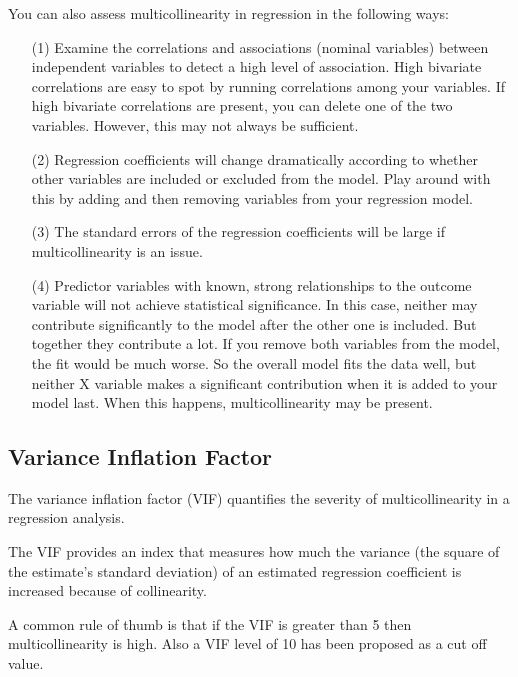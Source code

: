 \documentclass[12pt]{article}
\begin{document}
\bigskip

You can also assess multicollinearity in regression in the following ways:

\begin{itemize}
	\item [(1)] Examine the correlations and associations (nominal variables) between independent variables to detect a high level of association. High bivariate correlations are easy to spot by running correlations among your variables. If high bivariate correlations are present, you can delete one of the two variables. However, this may not always be sufficient.
	
	\item [(2)] Regression coefficients will change dramatically according to whether other variables are included or excluded from the model. Play around with this by adding and then removing variables from your regression model.
	
	\item [(3)] The standard errors of the regression coefficients will be large if multicollinearity is an issue.
	
	\item [(4)] Predictor variables with known, strong relationships to the outcome variable will not achieve statistical significance. In this case, neither may contribute significantly to the model after the other one is included. But together they contribute a lot. If you remove both variables from the model, the fit would be much worse. So the overall model fits the data well, but neither X variable makes a significant contribution when it is added to your model last. When this happens, multicollinearity may be present.
	
\end{itemize}

\subsection{Variance Inflation Factor}

The variance inflation factor (VIF) quantifies the severity of multicollinearity in a regression analysis.

The VIF provides an index that measures how much the variance (the square of the estimate's standard deviation) of an estimated regression coefficient is increased because of collinearity.


A common rule of thumb is that if the VIF is greater than 5 then multicollinearity is high. Also a VIF level of 10 has been proposed as a cut off value.
\end{document}
